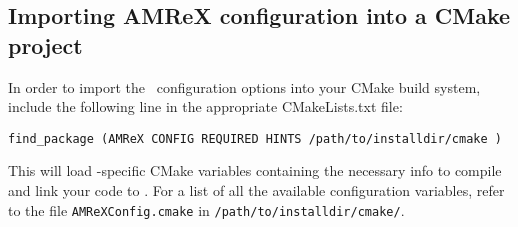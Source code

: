 \subsection{Importing AMReX configuration into a CMake project}
\label{sec:build:cmake:config}
In order to import the \amrex\ configuration options into your CMake
build system, include the following line in the appropriate
CMakeLists.txt file:
\begin{verbatim}
find_package (AMReX CONFIG REQUIRED HINTS /path/to/installdir/cmake )
\end{verbatim}
This will load \amrex-specific CMake variables containing the necessary
info to compile and link your code to \amrex. For a list of all the available
configuration variables, refer to the file {\tt AMReXConfig.cmake} in
{\tt /path/to/installdir/cmake/}.



